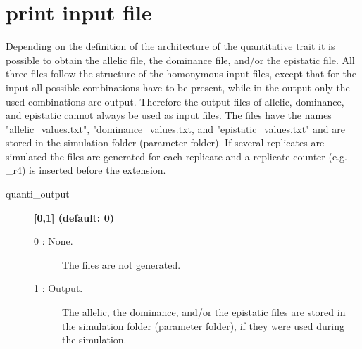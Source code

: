 \documentclass[letterpaper,12pt,oneside]{book}
\begin{document}
\section{print input file}
Depending on the definition of the architecture of the quantitative trait it is possible to obtain the allelic file, the dominance file, and/or the epistatic file. All three files follow the structure of the homonymous input files, except that for the input all possible combinations have to be present, while in the output only the used combinations are output. Therefore the output files of allelic, dominance, and epistatic cannot always be used as input files. The files have the names \textsf{"allelic\_values.txt"}, \textsf{"dominance\_values.txt}, and \textsf{"epistatic\_values.txt"} and are stored in the simulation folder (parameter \textsf{folder}). If several replicates are simulated the files are generated for each replicate and a replicate counter (e.g. \_r4) is inserted before the extension.

\begin{description}
\item[quanti\_output] \textbf{[0,1] (default: 0)}\\
\begin {description}
\item[0 : None.] The files are not generated.
\item[1 : Output.] The allelic, the dominance, and/or the epistatic files are stored in the simulation folder (parameter \textsf{folder}), if they were used during the simulation.
\end{description}
\end{description}


\clearpage
{}
{} 
 

\end{document}
